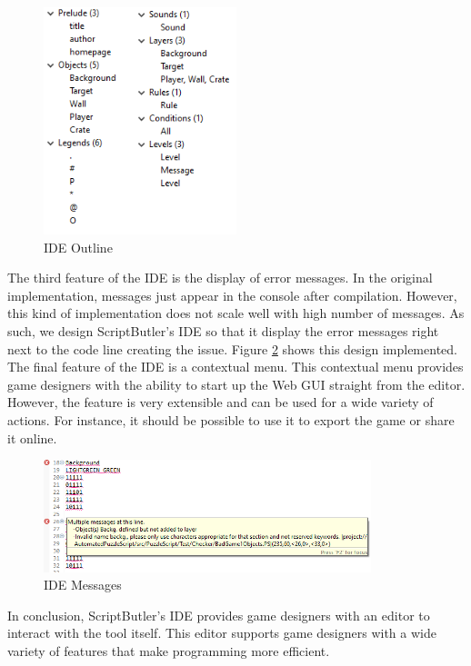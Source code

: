\begin{figure}[!t]
    \centering
    \includegraphics[width=0.5\textwidth]{images/Example_outline.png}
    \caption{IDE Outline}
    \label{fig:ide_outline}
\end{figure}

The third feature of the IDE is the display of error messages. In the original implementation, messages just appear in the console after compilation. However, this kind of implementation does not scale well with high number of messages. As such, we design ScriptButler's IDE so that it display the error messages right next to the code line creating the issue. Figure \ref{fig:ide_messages} shows this design implemented. The final feature of the IDE is a contextual menu. This contextual menu provides game designers with the ability to start up the Web GUI straight from the editor. However, the feature is very extensible and can be used for a wide variety of actions. For instance, it should be possible to use it to export the game or share it online. 

\begin{figure}[!t]
    \centering
    \includegraphics[width=0.85\textwidth]{images/Rascal_IDE.png}
    \caption{IDE Messages}
    \label{fig:ide_messages}
\end{figure}


In conclusion, ScriptButler's IDE provides game designers with an editor to interact with the tool itself. This editor supports game designers with a wide variety of features that make programming more efficient.



